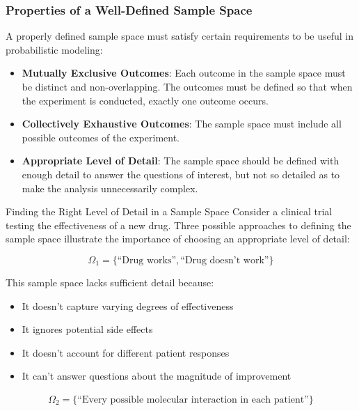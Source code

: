 \begin{itemize}
\subsubsection{Properties of a Well-Defined Sample Space}

A properly defined sample space must satisfy certain requirements to be useful in probabilistic modeling:

\begin{itemize}
    \item \textbf{Mutually Exclusive Outcomes}: Each outcome in the sample space must be distinct and non-overlapping. The outcomes must be defined so that when the experiment is conducted, exactly one outcome occurs.
    
    \item \textbf{Collectively Exhaustive Outcomes}: The sample space must include all possible outcomes of the experiment.
    
    \item \textbf{Appropriate Level of Detail}: The sample space should be defined with enough detail to answer the questions of interest, but not so detailed as to make the analysis unnecessarily complex.
\end{itemize}

\begin{exampleboxbreak}{Finding the Right Level of Detail in a Sample Space}
Consider a clinical trial testing the effectiveness of a new drug. Three possible approaches to defining the sample space illustrate the importance of choosing an appropriate level of detail:

\[ \Omega_1 = \{\text{``Drug works''}, \text{``Drug doesn't work''}\} \]

This sample space lacks sufficient detail because:
\begin{itemize}
    \item It doesn't capture varying degrees of effectiveness
    \item It ignores potential side effects
    \item It doesn't account for different patient responses
    \item It can't answer questions about the magnitude of improvement
\end{itemize}

\begin{align*}
\Omega_2 = \{\text{``Every possible molecular interaction in each patient''}\}
\end{align*}


\end{exampleboxbreak}
\end{itemize}
